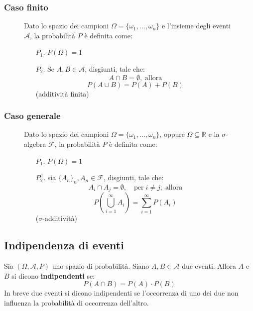 \documentclass[a4paper]{article}
\theoremstyle{break}
\theoremstyle{break}
\theoremstyle{break}
\theoremstyle{break}
\begin{document}
\subsubsection{Caso finito}
\begin{figure}[H]
	\begin{definition}
		Dato lo spazio dei campioni \( \Omega = \{\omega_1, \ldots, \omega_n\}  \) e
		l'insieme degli eventi \( \mathcal{A} \), la probabilità \( P \) è definita come:
		\begin{enumerate}
			\item[$P_1$.] \( P(\Omega) = 1 \)
			\item[$P_2$.] Se \( A,B \in \mathcal{A} \), disgiunti, tale che:
			      \[
				      A \cap B = \emptyset,\; \text{allora}
			      \]
			      \[
				      P(A \cup B) = P(A) + P(B)
			      \]
			      (additività finita)
		\end{enumerate}
	\end{definition}
\end{figure}

\subsubsection{Caso generale}
\begin{figure}[H]
	\begin{definition}
		Dato lo spazio dei campioni \( \Omega = \{\omega_1, \ldots, \omega_n\}  \),
		oppure \( \Omega \subseteq \mathbb{R} \) e
		la \( \sigma \)-algebra \( \mathcal{F} \), la probabilità \( P \) è definita come:
		\begin{enumerate}
			\item[$P_1$.] \( P(\Omega) = 1 \)
			\item[$P_2^\sigma$.] sia \( \{A_n\}_n, A_n \in \mathcal{F}  \), disgiunti, tale che:
			      \[
				      A_i \cap A_j = \emptyset, \quad \text{per}\; i \neq j;\; \text{allora}
			      \]
			      \[
				      P\left( \bigcup_{i=1}^{\infty} A_i \right) = \sum_{i=1}^{\infty} P(A_i)
			      \]
			      (\( \sigma  \)-additività)
		\end{enumerate}
	\end{definition}
\end{figure}

\subsection{Indipendenza di eventi}
Sia \( (\Omega, \mathcal{A}, P) \) uno spazio di probabilità. Siano \( A,B \in \mathcal{A} \)
due eventi. Allora \( A \) e \( B \) si dicono \textbf{indipendenti} se:
\[
	P(A \cap B) = P(A) \cdot P(B)
\]
In breve due eventi si dicono indipendenti se l'occorrenza di uno dei due non influenza
la probabilità di occorrenza dell'altro.
\end{document}
